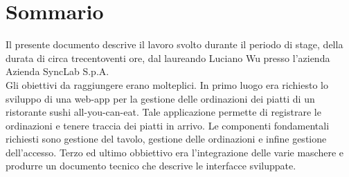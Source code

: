 
\cleardoublepage
{}
{}
\begingroup
\let\clearpage\relax
\let\cleardoublepage\relax
\let\cleardoublepage\relax

\chapter*{Sommario}

Il presente documento descrive il lavoro svolto durante il periodo di stage, della durata di circa trecentoventi ore, dal laureando Luciano Wu presso l'azienda Azienda SyncLab S.p.A.\\
Gli obiettivi da raggiungere erano molteplici. In primo luogo era richiesto lo sviluppo di una web-app per la gestione delle ordinazioni dei piatti di un ristorante sushi all-you-can-eat.
Tale applicazione permette di registrare le ordinazioni e tenere traccia dei piatti in arrivo.
Le componenti fondamentali richiesti sono gestione del tavolo, gestione delle ordinazioni e infine gestione dell'accesso.
Terzo ed ultimo obbiettivo era l'integrazione delle varie maschere e produrre un documento tecnico che descrive le interfacce sviluppate.
%
%

\endgroup			

\vfill

